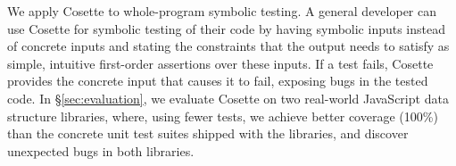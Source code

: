 \documentclass[sigconf, review]{acmart}
\newcommand{\jsil}{JSIL\xspace}
\newcommand{\JSComp}{JS-2-JSIL\xspace}
\newcommand{\cosette}{Cosette\xspace}
\newcommand{\pgmaxinline}[1]{ {\color{purple} *** PG : #1 ***} }
\begin{document}


















We apply Cosette to whole-program symbolic testing. 
A general developer can use \cosette for symbolic testing of
their code by having symbolic inputs instead of concrete
inputs and stating the constraints that the output needs to satisfy as
simple, intuitive first-order assertions over these inputs. If
a test fails, \cosette provides the concrete input that causes it to
fail, exposing bugs in the tested code. In \S\ref{sec:evaluation}, 
we evaluate \cosette on two real-world JavaScript data structure libraries,
where, using fewer tests, we achieve better coverage (100\%) than
the concrete unit test suites shipped with the libraries, and
discover unexpected bugs in both libraries.
\end{document}
